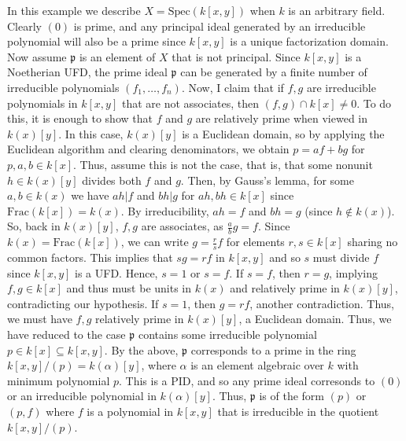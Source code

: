 \begin{example}
\label{example-spec-kxy}
In this example we describe $X = \text{Spec}(k[x,y])$
when $k$ is an arbitrary field.
Clearly $(0)$ is prime, and any principal ideal generated by an
irreducible polynomial will also be a prime since $k[x,y]$ is a
unique factorization domain. Now assume $\mathfrak p$ is an
element of $X$ that is not principal. Since $k[x,y]$ is a
Noetherian UFD, the prime ideal $\mathfrak p$ can be generated
by a finite number of irreducible polynomials $(f_1,\ldots, f_n)$.
Now, I claim that if $f, g$ are irreducible polynomials in $k[x,y]$
that are not associates, then $(f,g) \cap k[x] \neq 0$. To do this,
it is enough to show that $f$ and $g$ are relatively prime when
viewed in $k(x)[y]$. In this case, $k(x)[y]$ is a Euclidean domain,
so by applying the Euclidean algorithm and clearing denominators, we
obtain $p = af + bg$ for $p, a,b \in k[x]$. Thus, assume this is not
the case, that is, that some nonunit $h \in k(x)[y]$ divides both
$f$ and $g$. Then, by Gauss's lemma, for some $a, b \in k(x)$ we
have $ah | f$ and $bh | g$ for $ah, bh \in k[x]$ since
$\textrm{Frac}(k[x]) = k(x)$. By irreducibility, $ah = f$ and
$bh = g$ (since $h \notin k(x)$). So, back in $k(x)[y]$, $f,g $
are associates, as $\frac{a}{b} g = f$. Since
$k(x) = \textrm{Frac}(k[x])$, we can write $g = \frac{r}{s} f $
for elements $r ,s \in k[x]$ sharing no common factors. This
implies that $sg = rf$ in $k[x,y]$ and so $s$ must divide $f$
since $k[x,y]$ is a UFD. Hence, $s = 1$ or $s = f$. If $s = f$,
then $r = g$, implying $f, g \in k[x]$ and thus must be units in
$k(x)$ and relatively prime in $k(x)[y]$, contradicting our
hypothesis. If $s = 1$, then $g = rf$, another contradiction.
Thus, we must have $f, g$ relatively prime in $k(x)[y]$, a
Euclidean domain. Thus, we have reduced to the case $\mathfrak p$
contains some irreducible polynomial $p \in k[x] \subseteq k[x,y]$.
By the above, $\mathfrak p$ corresponds to a prime in the ring
$k[x,y]/(p) = k(\alpha)[y]$, where $\alpha$ is an element
algebraic over $k$ with minimum polynomial $p$. This is a
PID, and so any prime ideal corresonds to $(0)$ or an
irreducible polynomial in $k(\alpha)[y]$. Thus, $\mathfrak p$
is of the form $(p)$ or $(p, f)$ where $f$ is a
polynomial in $k[x,y]$ that is irreducible in the quotient
$k[x,y]/(p)$.
\end{example}

